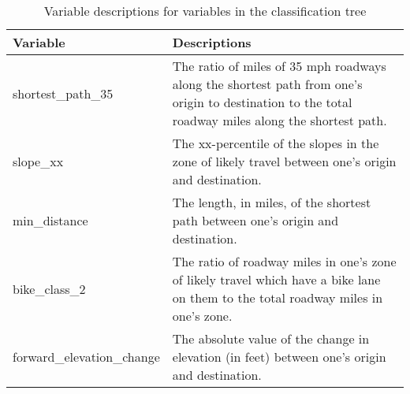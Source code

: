\begin{table}
\begin{tabularx}{\textwidth}{l X}
\toprule
\multicolumn{1}{l}{Variable} & Descriptions \\
\midrule

shortest\_path\_35 & The ratio of miles of 35 mph roadways along the shortest path from one's origin to destination to the total roadway miles along the shortest path. 
 \\[1.2ex]
slope\_xx & The xx-percentile of the slopes in the zone of likely travel between one's origin and destination. 
\\[1.2ex]
min\_distance & The length, in miles, of the shortest path between one's origin and destination. 
 \\[1.2ex]
bike\_class\_2 & The ratio of roadway miles in one's zone of likely travel which have a bike lane on them to the total roadway miles in one's zone. 
\\ [1.2ex]
forward\_elevation\_change  & The absolute value of the change in elevation (in feet) between one's origin and destination. \\ 
\bottomrule

\end{tabularx}

\caption{Variable descriptions for variables in the classification tree}
\label{table:var_descriptions}
\end{table}